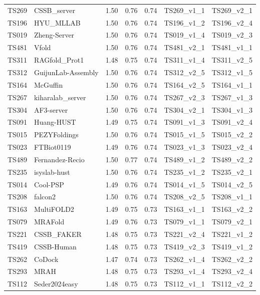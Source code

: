\begin{longtable}{lllllll}
TS269 & CSSB\_server & 1.50 & 0.76 & 0.74 & TS269\_v1\_1 & TS269\_v2\_1 \\ 
TS196 & HYU\_MLLAB & 1.50 & 0.76 & 0.74 & TS196\_v1\_2 & TS196\_v2\_4 \\ 
TS019 & Zheng-Server & 1.50 & 0.76 & 0.74 & TS019\_v1\_4 & TS019\_v2\_3 \\ 
TS481 & Vfold & 1.50 & 0.76 & 0.74 & TS481\_v2\_1 & TS481\_v1\_1 \\ 
TS311 & RAGfold\_Prot1 & 1.48 & 0.75 & 0.74 & TS311\_v1\_4 & TS311\_v2\_5 \\ 
TS312 & GuijunLab-Assembly & 1.50 & 0.76 & 0.74 & TS312\_v2\_5 & TS312\_v1\_5 \\ 
TS164 & McGuffin & 1.50 & 0.76 & 0.74 & TS164\_v2\_5 & TS164\_v1\_1 \\ 
TS267 & kiharalab\_server & 1.50 & 0.76 & 0.74 & TS267\_v2\_3 & TS267\_v1\_3 \\ 
TS304 & AF3-server & 1.50 & 0.76 & 0.74 & TS304\_v2\_1 & TS304\_v1\_3 \\ 
TS091 & Huang-HUST & 1.49 & 0.75 & 0.74 & TS091\_v1\_3 & TS091\_v2\_4 \\ 
TS015 & PEZYFoldings & 1.50 & 0.76 & 0.74 & TS015\_v1\_5 & TS015\_v2\_2 \\ 
TS023 & FTBiot0119 & 1.49 & 0.76 & 0.74 & TS023\_v1\_3 & TS023\_v2\_4 \\ 
TS489 & Fernandez-Recio & 1.50 & 0.77 & 0.74 & TS489\_v1\_2 & TS489\_v2\_2 \\ 
TS235 & isyslab-hust & 1.50 & 0.76 & 0.74 & TS235\_v1\_2 & TS235\_v2\_1 \\ 
TS014 & Cool-PSP & 1.49 & 0.76 & 0.74 & TS014\_v1\_5 & TS014\_v2\_5 \\ 
TS208 & falcon2 & 1.50 & 0.76 & 0.74 & TS208\_v2\_5 & TS208\_v1\_1 \\ 
TS163 & MultiFOLD2 & 1.49 & 0.75 & 0.73 & TS163\_v1\_1 & TS163\_v2\_2 \\ 
TS079 & MRAFold & 1.49 & 0.76 & 0.73 & TS079\_v1\_1 & TS079\_v2\_1 \\ 
TS221 & CSSB\_FAKER & 1.48 & 0.75 & 0.73 & TS221\_v2\_4 & TS221\_v1\_2 \\ 
TS419 & CSSB-Human & 1.48 & 0.75 & 0.73 & TS419\_v2\_3 & TS419\_v1\_2 \\ 
TS262 & CoDock & 1.47 & 0.74 & 0.73 & TS262\_v1\_4 & TS262\_v2\_2 \\ 
TS293 & MRAH & 1.48 & 0.75 & 0.73 & TS293\_v1\_4 & TS293\_v2\_4 \\ 
TS112 & Seder2024easy & 1.48 & 0.75 & 0.73 & TS112\_v1\_1 & TS112\_v2\_2 \\ 

\end{longtable}
